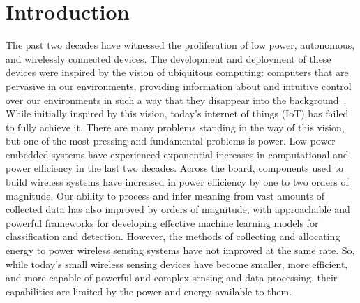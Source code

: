 \chapter{Introduction}
\label{chap:intro}

The past two decades have witnessed the proliferation of low power, autonomous, and wirelessly connected devices.
The development and deployment of these devices were inspired by the vision of ubiquitous computing: computers that are pervasive in our environments, providing information about and intuitive control over our environments in such a way that they disappear into the background~\cite{weiser1991computer}.
While initially inspired by this vision, today's internet of things (IoT) has failed to fully achieve it.
There are many problems standing in the way of this vision, but one of the most pressing and fundamental problems is power.
Low power embedded systems have experienced exponential increases in computational and power efficiency in the last two decades. Across the board, components used to build wireless systems have increased in power efficiency by one to two orders of magnitude.
Our ability to process and infer meaning from vast amounts of collected data has also improved by orders of magnitude, with approachable and powerful frameworks for developing effective machine learning models for classification and detection.
However, the methods of collecting and allocating energy to power wireless sensing systems have not improved at the same rate.
So, while today's small wireless sensing devices have become smaller, more efficient, and more capable of powerful and complex sensing and data processing, their capabilities are limited by the power and energy available to them. 

